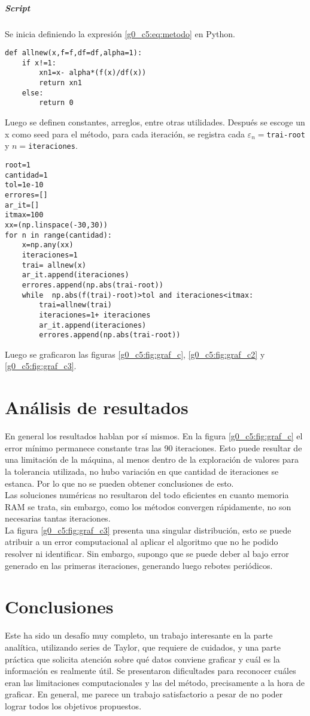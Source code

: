 \documentclass[../portafolio.tex]{subfiles}
\begin{document}
\subparagraph{Script}
 Se inicia definiendo la expresión \eqref{g0_c5:eq:metodo} en Python. 
\begin{verbatim}
def allnew(x,f=f,df=df,alpha=1):
    if x!=1:
        xn1=x- alpha*(f(x)/df(x))
        return xn1
    else:
        return 0
\end{verbatim}
Luego se definen constantes, arreglos, entre otras utilidades. Después se escoge un x como seed para el método, para cada iteración, se registra cada $\varepsilon_n=$\texttt{trai-root} y $n=$\texttt{iteraciones}.


\begin{verbatim}
root=1
cantidad=1
tol=1e-10
errores=[]
ar_it=[]
itmax=100
xx=(np.linspace(-30,30))
for n in range(cantidad):
    x=np.any(xx)
    iteraciones=1
    trai= allnew(x)
    ar_it.append(iteraciones)
    errores.append(np.abs(trai-root))
    while  np.abs(f(trai)-root)>tol and iteraciones<itmax:
        trai=allnew(trai)
        iteraciones=1+ iteraciones
        ar_it.append(iteraciones)
        errores.append(np.abs(trai-root))
\end{verbatim}


Luego se graficaron las figuras \ref{g0_c5:fig:graf_c}, \ref{g0_c5:fig:graf_c2} y \ref{g0_c5:fig:graf_c3}.


\section{Análisis de resultados}
En general los resultados hablan por sí mismos. En la figura \ref{g0_c5:fig:graf_c} el error mínimo permanece constante tras las 90 iteraciones. Esto puede resultar de una limitación de la máquina, al menos dentro de la exploración de valores para la tolerancia utilizada, no hubo variación en que cantidad de iteraciones se estanca. Por lo que no se pueden obtener conclusiones de esto. \\
Las soluciones numéricas no resultaron del todo eficientes en cuanto memoria RAM se trata, sin embargo, como los métodos convergen rápidamente, no son necesarias tantas iteraciones.\\
La figura \ref{g0_c5:fig:graf_c3} presenta una singular distribución, esto se puede atribuir a un error computacional al aplicar el algoritmo que no he podido resolver ni identificar. Sin embargo, supongo que se puede deber al bajo error generado en las primeras iteraciones, generando luego rebotes periódicos.
\section*{Conclusiones}
Este ha sido un desafío muy completo, un trabajo interesante en la parte analítica, utilizando series de Taylor, que requiere de cuidados, y una parte práctica que solicita atención sobre qué datos conviene graficar y cuál es la información es realmente útil. Se presentaron dificultades para reconocer cuáles eran las limitaciones computacionales y las del método, precisamente a la hora de graficar. En general, me parece un trabajo satisfactorio a pesar de no poder lograr todos los objetivos propuestos.
\end{document}
